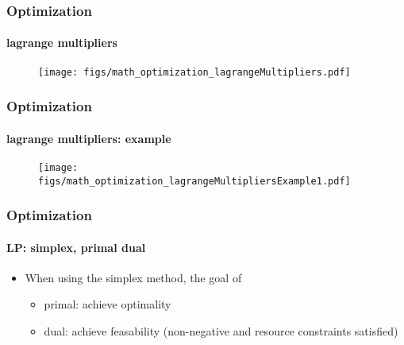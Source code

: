 \begin{frame}
\frametitle{Optimization}
\framesubtitle{lagrange multipliers}
\logoCSIPCPL\mypagenum
{}
	\begin{figure}				
		\texttt{[image: figs/math\_optimization\_lagrangeMultipliers.pdf]}
	\end{figure}
\end{frame}



\begin{frame}
\frametitle{Optimization}
\framesubtitle{lagrange multipliers: example}
\logoCSIPCPL\mypagenum
	\begin{figure}				
		\texttt{[image: figs/math\_optimization\_lagrangeMultipliersExample1.pdf]}
	\end{figure}
\end{frame}


\begin{frame}
\frametitle{Optimization}
\framesubtitle{LP: simplex, primal dual}
\logoCSIPCPL\mypagenum
	\begin{itemize}
		\item When using the simplex method, the goal of 
			\begin{itemize}
				\item primal: achieve optimality
				\item dual: achieve feasability (non-negative and resource constraints satisfied)
			\end{itemize}
	\end{itemize}
\end{frame}




